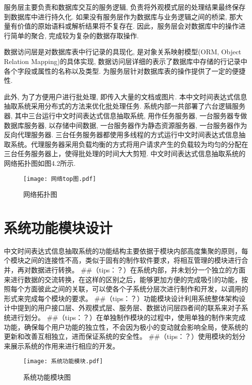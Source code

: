 服务层主要负责和数据库交互的服务逻辑, 负责将外观模式层的处理结果最终保存到数据库中进行持久化.
如果没有服务层作为数据库与业务逻辑之间的桥梁, 那大量有价值的原始语料或解析结果将不复存在.
因此，服务层会对数据库中的操作进行简单的聚合, 完成较为复杂的数据存取操作.

数据访问层是对数据库表中行记录的具现化, 是对象关系映射模型(ORM, Object Relation Mapping)的具体实现, 数据访问层详细的表示了数据库中存储的行记录中各个字段或属性的名称以及类型.
为服务层针对数据库表的操作提供了一定的便捷性.

此外, 为了方便用户进行批处理, 即传入大量的文档或图片. 本中文时间表达式信息抽取系统采用分布式的方法来优化批处理任务.
系统内部一共部署了六台逻辑服务器, 其中三台运行中文时间表达式信息抽取系统, 用作任务服务器, 一台服务器专做数据库服务器, 以存储中间数据, 一台服务器作为静态资源服务器, 一台服务器作为反向代理服务器.
三台任务服务器都使用多线程的方式运行中文时间表达式信息抽取系统。代理服务器采用负载均衡的方式将用户请求产生的负载较为均匀的分配在三台任务服务器上，使得批处理的时间大大剪短.
中文时间表达式信息抽取系统的网络拓扑图如图4.2所示.

\begin{figure}[h]
  \centering
  \texttt{[image: 网络top图.pdf]}
  \caption{网络拓扑图}
  \label{fig:network_top}
\end{figure}

\section{系统功能模块设计}

中文时间表达式信息抽取系统的功能结构主要依据于模块内部高度集聚的原则，每个模块之间的连接性不高，类似于固有的制作软件要求，将相互管理的模块进行合并，再对数据进行转换。
##（tips：？）在系统内部，并未划分一个独立的方面来进行数据的交流转换，在这样的区别之后，能够更加方便的完成吸引的功能，按照每个方面彼此之间的关联，可以使各个子系统分层次进行制作和开发，以调用的形式来完成每个模块的要求。
##（tips：？）功能模块设计利用系统整体架构设计中提到的用户接口层、外观模式层、服务层、数据访问层四者间的联系来对子系统进行划分。
##（tips：？）在单独制作模块的过程中，使用单独的制作来完成功能，确保每个用户功能的独立性，不会因为极小的变动就会影响全局，使系统的更新和改善互相独立，进而保证系统的安全性。
##（tips：？）使用模块的划分来展示系统的作用来进行相应的开发。

\begin{figure}[h]
  \centering
  \texttt{[image: 系统功能模块.pdf]}
  \caption{系统功能模块图}
  \label{fig:system_feature}
\end{figure}

